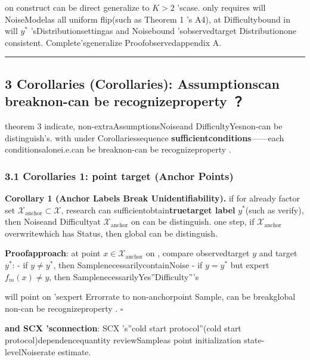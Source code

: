 \documentclass[
  12pt,
]{article}
\begin{document}
on construct can be direct generalize to  \(K > 2\) 'scase. only requires will NoiseModelas all uniform flip(such as 
Theorem 1 's A4), at Difficultybound in will  \(y^*\)
'sDistributionsettingas and Noisebound 'sobservedtarget Distributionone consistent. Complete'sgeneralize Proofobservedappendix A. 

\begin{center}\rule{0.5\linewidth}{0.5pt}\end{center}

\subsection{3 Corollaries
(Corollaries): Assumptionscan breaknon-can be recognizeproperty ？}\label{ux63a8ux8bba-corollariesux54eaux4e9bux5047ux8bbeux80fdux6253ux7834ux4e0dux53efux8bc6ux522bux6027}

theorem  3
indicate, non-extraAssumptionsNoiseand DifficultyYesnon-can be distinguish's. with under Corollariessequence \textbf{sufficientconditions}------each conditionsalonei.e.can be breaknon-can be recognizeproperty . 

\subsubsection{3.1 Corollaries 1: point target  (Anchor
Points)}\label{ux63a8ux8bba-1ux951aux70b9ux6807ux7b7e-anchor-points}

\textbf{Corollary 1 (Anchor Labels Break Unidentifiability).}
if for already factor set 
\(\mathcal{X}_{\text{anchor}} \subset \mathcal{X}\), research can sufficientobtain\textbf{truetarget label}
\(y^*\)(such as verify), then Noiseand Difficultyat  \(\mathcal{X}_{\text{anchor}}\)
on can be distinguish. one step, if  \(\mathcal{X}_{\text{anchor}}\)
overwritewhich has Status, then global can be distinguish. 

\textbf{Proofapproach}: at point  \(x \in \mathcal{X}_{\text{anchor}}\)
on , compare observedtarget  \(y\) and target  \(y^*\):  - if 
\(y \neq y^*\), then SamplenecessarilycontainNoise - if  \(y = y^*\) but expert 
\(f_m(x) \neq y\), then SamplenecessarilyYes''Difficulty'''s

will point on 'sexpert Errorrate to non-anchorpoint Sample, can be breakglobal non-can be recognizeproperty . \(\square\)

\textbf{and  SCX 'sconnection}: SCX 's''cold start protocol''(cold start
protocol)dependencequantity reviewSampleas point initialization state-levelNoiserate estimate. 
\end{document}
